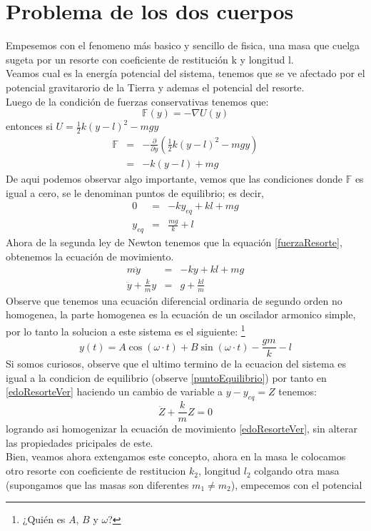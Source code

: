 \documentclass[12pt,a4paper]{article}
\begin{document}
\section{Problema de los dos cuerpos}
Empesemos con el fenomeno más basico y sencillo de fisica, una masa que cuelga sugeta por un resorte con coeficiente de restitución k y longitud l.\\
Veamos cual es la energía potencial del sistema, tenemos que se ve afectado por el potencial gravitarorio de la Tierra y ademas el potencial del resorte.\\
Luego de la condición de fuerzas conservativas tenemos que:
$$\mathbb{F}(y)=-\nabla U(y)$$
entonces si $U=\frac{1}{2}k(y-l)^2-mgy$
\begin{eqnarray}
\mathbb{F}&=&-\frac{\partial}{\partial y}\left(\frac{1}{2}k(y-l)^2-mgy\right)\nonumber\label{fuerzaResorte}\\
&=&-k(y-l)+mg
\end{eqnarray}
De aqui podemos observar algo importante, vemos que las condiciones donde $\mathbb{F}$ es igual a cero, se le denominan puntos de equilibrio; es decir,
\begin{eqnarray}
0&=&-ky_{eq}+kl+mg\nonumber\\
y_{eq}&=&\frac{mg}{k}+l\label{puntoEquilibrio}
\end{eqnarray}
Ahora de la segunda ley de Newton tenemos que la equación \ref{fuerzaResorte}, obtenemos la ecuación de movimiento.
\begin{eqnarray}
m\ddot y&=&-ky+kl+mg\nonumber\\
\ddot y +\frac{k}{m}y&=&g+\frac{kl}{m}\label{edoResorteVer}
\end{eqnarray}
Observe que tenemos una ecuación diferencial ordinaria de segundo orden no homogenea, la parte homogenea es la ecuación de un oscilador armonico simple, por lo tanto la solucion a este sistema es el siguiente:
\footnote{¿Quién es $A$, $B$ y $\omega$?}$$y(t)=A\cos(\omega\cdot t)+B\sin(\omega\cdot t)-\frac{gm}{k}-l$$
Si somos curiosos, observe que el ultimo termino de la ecuacion del sistema es igual a la condicion de equilibrio (observe \ref{puntoEquilibrio}) por tanto en \ref{edoResorteVer} haciendo un cambio de variable a $y-y_{eq}=Z$\label{cambioVariable} tenemos:
$$\ddot{Z}+\frac{k}{m}Z=0$$
logrando asi homogenizar la ecuación de movimiento \ref{edoResorteVer}, sin alterar las propiedades pricipales de este.
\\
Bien, veamos ahora extengamos este concepto, ahora en la masa le colocamos otro resorte con coeficiente de restitucion $k_2$, longitud $l_2$ colgando otra masa (supongamos que las masas son diferentes $m_1\neq m_2$), empecemos con el potencial
\end{document}
